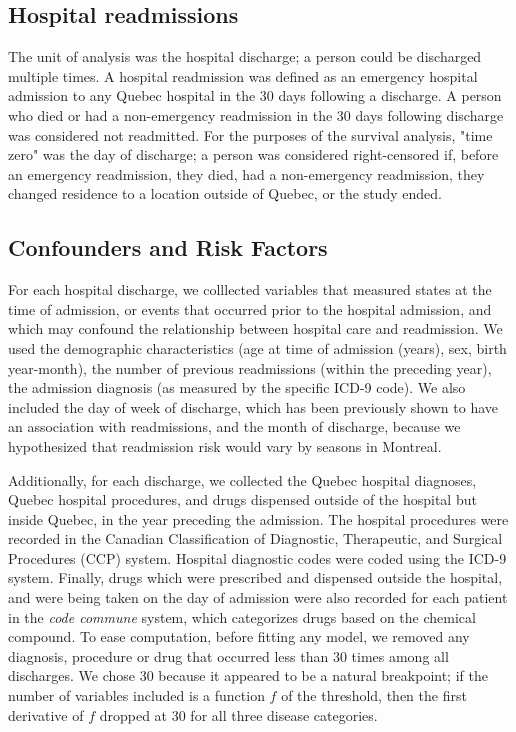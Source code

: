 \documentclass[]{article}\usepackage[]{graphicx}\usepackage[]{color}
\begin{document}
\subsection{Hospital readmissions}
The unit of analysis was the hospital discharge; a person could be discharged multiple times. A hospital readmission was defined as an emergency hospital admission to any Quebec hospital in the 30 days following a discharge.  A person who died or had a non-emergency readmission in the 30 days following discharge was considered not readmitted. For the purposes of the survival analysis, "time zero" was the day of discharge; a person was considered right-censored if, before an emergency readmission, they died, had a non-emergency readmission, they changed residence to a location outside of Quebec, or the study ended.

\subsection{Confounders and Risk Factors}
For each hospital discharge, we colllected variables that measured states at the time of admission, or events that occurred prior to the hospital admission, and which may confound the relationship between hospital care and readmission. We used the demographic characteristics (age at time of admission (years), sex, birth year-month), the number of previous readmissions (within the preceding year), the admission diagnosis (as measured by the specific ICD-9 code). We also included the day of week of discharge, which has been previously shown to have an association with readmissions\supercite{van_walraven_risk_2002}, and the month of discharge, because we hypothesized that readmission risk would vary by seasons in Montreal.

Additionally, for each discharge, we collected the Quebec hospital diagnoses, Quebec hospital procedures, and drugs dispensed outside of the hospital but inside Quebec, in the year preceding the admission. The hospital procedures were recorded in the Canadian Classification of Diagnostic, Therapeutic, and Surgical Procedures (CCP) system. Hospital diagnostic codes were coded using the ICD-9 system. Finally, drugs which were prescribed and dispensed outside the hospital, and were being taken on the day of admission were also recorded for each patient in the \emph{code commune} system, which categorizes drugs based on the chemical compound. To ease computation, before fitting any model, we removed any diagnosis, procedure or drug that occurred less than 30 times among all discharges. We chose 30 because it appeared to be a natural breakpoint; if the number of variables included is a function $f$ of the threshold, then the first derivative of $f$ dropped at 30 for all three disease categories.
\end{document}
